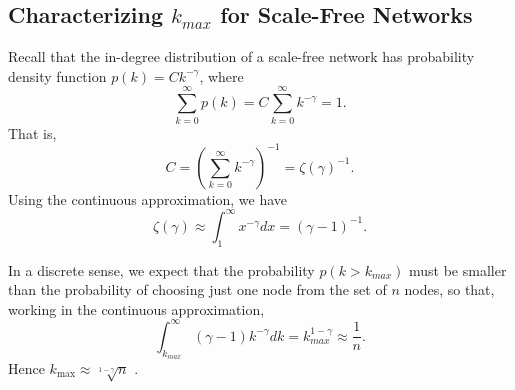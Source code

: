 \documentclass[11pt,a4paper,twocolumn]{article}
\begin{document}
\begin{singlespace}
\section{Characterizing $k_{max}$ for Scale-Free Networks}

Recall that the in-degree distribution of a scale-free network has probability
density function $p(k)=Ck^{-\gamma}$, where
\[\sum_{k=0}^{\infty} p(k) = C\sum_{k=0}^{\infty} k^{-\gamma} = 1.\]
That is,
\begin{equation}C=\left(\sum_{k=0}^{\infty} k^{-\gamma}\right)^{-1}
=\zeta(\gamma)^{-1}.\end{equation}
Using the continuous approximation, we have
\begin{equation}\zeta(\gamma)\approx \int_1^{\infty} x^{-\gamma} dx
=(\gamma-1)^{-1}.\end{equation}

In a discrete sense, we expect that the probability $p\left(k>k_{max}\right)$
must be smaller than the probability of choosing just one node from the set
of $n$ nodes, so that, working in the continuous approximation,
\begin{equation}\int_{k_{max}}^{\infty} (\gamma-1)k^{-\gamma} dk
=k_{max}^{1-\gamma}\approx \frac{1}{n}.\end{equation}
Hence $k_{\max}\approx \sqrt[1-\gamma]{n}$ \cite{CLASS}.

\printbibliography[title={References}]

\end{singlespace}
\end{document}
